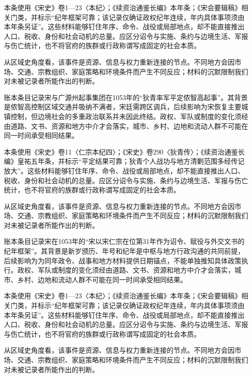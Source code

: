 本条使用《宋史》卷1—23〈本纪〉；《续资治通鉴长编》本年条；《宋会要辑稿》相关门类，并标示“纪年框架可靠；该记录仅确证政权纪年连续，年内具体事项须由本年条另证”。这些材料能够钉住年序、命令、战役或局部地点，却不能直接推出人口、税收、身份和社会动机的总量。应区分诏令与实施、条约与边境生活、军报与伤亡统计，也不将官府的族群或行政称谓写成固定的社会本质。

从区域史角度看，该事件是资源、信息与权力重新连接的节点。不同地方会因市场、交通、宗教组织、家庭策略和环境条件而产生不同反应；材料的沉默限制我们对未被记录者所能作出的判断。

账本条目记录宋与广源州起事集团在1053年的“狄青率军平定侬智高起事”。其背景是侬智高控制区域交通并吸纳不满者，宋廷需跨区调兵，后续影响为宋恢复主要城镇控制，但边境社会的多重政治联系并未因此终结。政权、军队或制度的变化须经由道路、文书、资源和地方中介才会落实，城市、乡村、边地和流动人群不可能在同一时间承受相同结果。

本条使用《宋史》卷11〈仁宗本纪四〉；《宋史》卷290〈狄青传〉；《续资治通鉴长编》皇祐五年条，并标示“平定结果可靠；狄青个人战功与地方清剿范围多经传记放大”。这些材料能够钉住年序、命令、战役或局部地点，却不能直接推出人口、税收、身份和社会动机的总量。应区分诏令与实施、条约与边境生活、军报与伤亡统计，也不将官府的族群或行政称谓写成固定的社会本质。

从区域史角度看，该事件是资源、信息与权力重新连接的节点。不同地方会因市场、交通、宗教组织、家庭策略和环境条件而产生不同反应；材料的沉默限制我们对未被记录者所能作出的判断。

账本条目记录宋在1053年的“宋以宋仁宗在位第31年作为诏令、赋役与外交文书的纪年框架”。其背景是新岁颁历、年号和纪年是中枢与地方行政沟通的共同前提，后续影响为为同年政令、战事和地方材料提供日期锚点，不能单独推知具体政策执行。政权、军队或制度的变化须经由道路、文书、资源和地方中介才会落实，城市、乡村、边地和流动人群不可能在同一时间承受相同结果。

本条使用《宋史》卷1—23〈本纪〉；《续资治通鉴长编》本年条；《宋会要辑稿》相关门类，并标示“纪年框架可靠；该记录仅确证政权纪年连续，年内具体事项须由本年条另证”。这些材料能够钉住年序、命令、战役或局部地点，却不能直接推出人口、税收、身份和社会动机的总量。应区分诏令与实施、条约与边境生活、军报与伤亡统计，也不将官府的族群或行政称谓写成固定的社会本质。

从区域史角度看，该事件是资源、信息与权力重新连接的节点。不同地方会因市场、交通、宗教组织、家庭策略和环境条件而产生不同反应；材料的沉默限制我们对未被记录者所能作出的判断。

